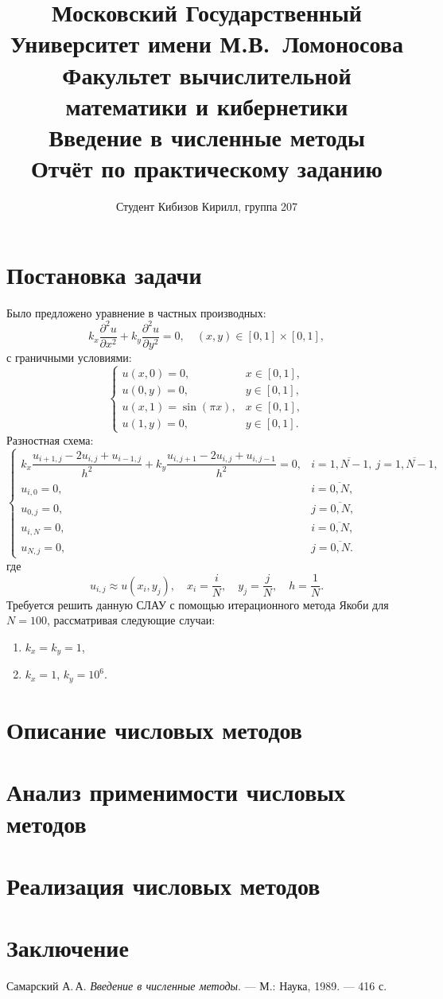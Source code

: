 \documentclass[a4paper]{report}
\title{
\textbf{Московский Государственный Университет имени М.В.\ Ломоносова}\\
\textbf{Факультет вычислительной математики и кибернетики}\\
\textbf{Введение в численные методы}\\
Отчёт по практическому заданию
}
\author{
Студент Кибизов Кирилл, группа 207
}
\date{\number\year}
\begin{document}
\maketitle

\tableofcontents

\chapter*{Постановка задачи}

Было предложено уравнение в частных производных:
\[
k_x \frac{\partial^2 u}{\partial x^2} + k_y \frac{\partial^2 u}{\partial y^2} = 0, \quad (x, y) \in [0, 1] \times [0, 1],
\]
с граничными условиями:
\[
\begin{cases}
u(x, 0) = 0, & x \in [0, 1], \\
u(0, y) = 0, & y \in [0, 1], \\
u(x, 1) = \sin(\pi x), & x \in [0, 1], \\
u(1, y) = 0, & y \in [0, 1].
\end{cases}
\]
Разностная схема:
\[
\begin{cases}
k_x \dfrac{u_{i+1,j} - 2u_{i,j} + u_{i-1,j}}{h^2} + k_y \dfrac{u_{i,j+1} - 2u_{i,j} + u_{i,j-1}}{h^2} = 0, & i = \overline{1,N-1},\ j = \overline{1,N-1}, \\
u_{i,0} = 0, & i = \overline{0,N}, \\
u_{0,j} = 0, & j = \overline{0,N}, \\
u_{i,N} = 0, & i = \overline{0,N}, \\
u_{N,j} = 0, & j = \overline{0,N}.
\end{cases}
\]
где
\[
u_{i,j} \approx u(x_i, y_j), \quad x_i = \dfrac{i}{N}, \quad y_j = \dfrac{j}{N}, \quad h = \dfrac{1}{N}.
\]
Требуется решить данную СЛАУ с помощью итерационного метода Якоби для $N = 100$, рассматривая следующие случаи:
\begin{enumerate}
    \item $k_x = k_y = 1$,
    \item $k_x = 1$, \quad $k_y = 10^6$.
\end{enumerate}

\chapter*{Описание числовых методов}

\chapter*{Анализ применимости числовых методов}

\chapter*{Реализация числовых методов}

\chapter*{Заключение}

\begin{thebibliography}{1}
\renewcommand{\bibname}{Литература}
 Самарский А.\,А. \textit{Введение в численные методы}. — М.: Наука, 1989. — 416 с.
\end{thebibliography}
\end{document}
